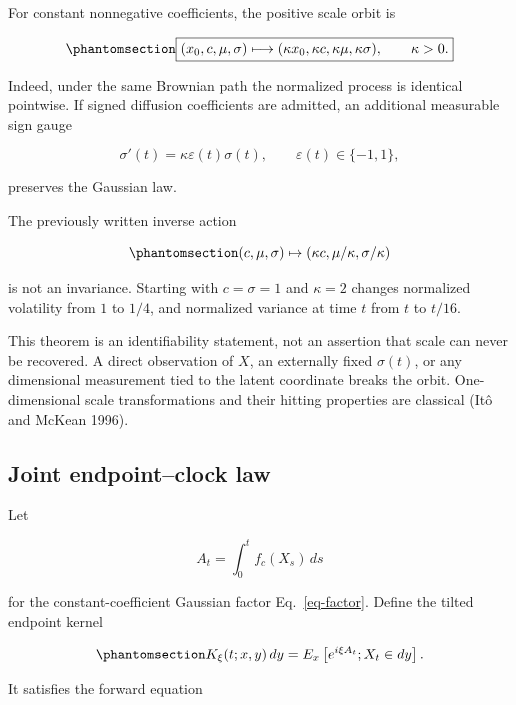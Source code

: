 \documentclass[
  english,
  11pt,
  letterpaper,
  DIV=11,
  numbers=noendperiod]{scrartcl}
\theoremstyle{plain}
\theoremstyle{plain}
\theoremstyle{plain}
\theoremstyle{plain}
\theoremstyle{remark}
\begin{document}
For constant nonnegative coefficients, the positive scale orbit is

\begin{equation}\protect\phantomsection\label{eq-correct-scale-orbit}{
\boxed{
(x_0,c,\mu,\sigma)
\longmapsto
(\kappa x_0,\kappa c,\kappa\mu,\kappa\sigma),
\qquad \kappa>0.
}
}\end{equation}

Indeed, under the same Brownian path the normalized process is identical
pointwise. If signed diffusion coefficients are admitted, an additional
measurable sign gauge

\[
\sigma'(t)=\kappa\varepsilon(t)\sigma(t),
\qquad
\varepsilon(t)\in\{-1,1\},
\]

preserves the Gaussian law.

The previously written inverse action

\begin{equation}\protect\phantomsection\label{eq-incorrect-scale}{
(c,\mu,\sigma)
\mapsto
(\kappa c,\mu/\kappa,\sigma/\kappa)
}\end{equation}

is not an invariance. Starting with \(c=\sigma=1\) and \(\kappa=2\)
changes normalized volatility from \(1\) to \(1/4\), and normalized
variance at time \(t\) from \(t\) to \(t/16\).

This theorem is an identifiability statement, not an assertion that
scale can never be recovered. A direct observation of \(X\), an
externally fixed \(\sigma(t)\), or any dimensional measurement tied to
the latent coordinate breaks the orbit. One-dimensional scale
transformations and their hitting properties are classical (Itô and
McKean 1996).

\subsection{Joint endpoint--clock law}\label{sec-endpoint-clock}

Let

\[
A_t=\int_0^tf_c(X_s)\,ds
\]

for the constant-coefficient Gaussian factor Eq.~\ref{eq-factor}. Define
the tilted endpoint kernel

\begin{equation}\protect\phantomsection\label{eq-tilted-endpoint-kernel}{
K_\xi(t;x,y)\,dy
=E_x\left[
e^{i\xi A_t};X_t\in dy
\right].
}\end{equation}

It satisfies the forward equation
\end{document}
